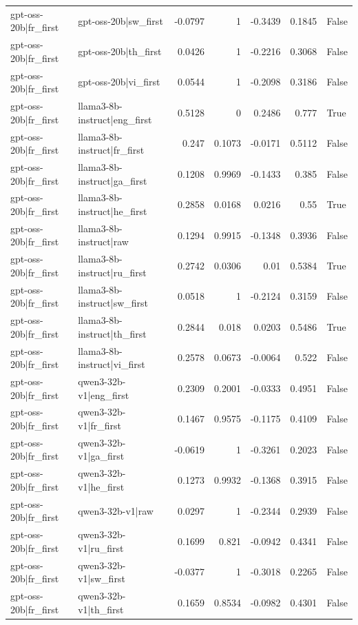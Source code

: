 \begin{table}
\begin{tabular}{l l r r r r l}
gpt-oss-20b|fr_first & gpt-oss-20b|sw_first & -0.0797 & 1 & -0.3439 & 0.1845 & False \\
gpt-oss-20b|fr_first & gpt-oss-20b|th_first & 0.0426 & 1 & -0.2216 & 0.3068 & False \\
gpt-oss-20b|fr_first & gpt-oss-20b|vi_first & 0.0544 & 1 & -0.2098 & 0.3186 & False \\
gpt-oss-20b|fr_first & llama3-8b-instruct|eng_first & 0.5128 & 0 & 0.2486 & 0.777 & True \\
gpt-oss-20b|fr_first & llama3-8b-instruct|fr_first & 0.247 & 0.1073 & -0.0171 & 0.5112 & False \\
gpt-oss-20b|fr_first & llama3-8b-instruct|ga_first & 0.1208 & 0.9969 & -0.1433 & 0.385 & False \\
gpt-oss-20b|fr_first & llama3-8b-instruct|he_first & 0.2858 & 0.0168 & 0.0216 & 0.55 & True \\
gpt-oss-20b|fr_first & llama3-8b-instruct|raw & 0.1294 & 0.9915 & -0.1348 & 0.3936 & False \\
gpt-oss-20b|fr_first & llama3-8b-instruct|ru_first & 0.2742 & 0.0306 & 0.01 & 0.5384 & True \\
gpt-oss-20b|fr_first & llama3-8b-instruct|sw_first & 0.0518 & 1 & -0.2124 & 0.3159 & False \\
gpt-oss-20b|fr_first & llama3-8b-instruct|th_first & 0.2844 & 0.018 & 0.0203 & 0.5486 & True \\
gpt-oss-20b|fr_first & llama3-8b-instruct|vi_first & 0.2578 & 0.0673 & -0.0064 & 0.522 & False \\
gpt-oss-20b|fr_first & qwen3-32b-v1|eng_first & 0.2309 & 0.2001 & -0.0333 & 0.4951 & False \\
gpt-oss-20b|fr_first & qwen3-32b-v1|fr_first & 0.1467 & 0.9575 & -0.1175 & 0.4109 & False \\
gpt-oss-20b|fr_first & qwen3-32b-v1|ga_first & -0.0619 & 1 & -0.3261 & 0.2023 & False \\
gpt-oss-20b|fr_first & qwen3-32b-v1|he_first & 0.1273 & 0.9932 & -0.1368 & 0.3915 & False \\
gpt-oss-20b|fr_first & qwen3-32b-v1|raw & 0.0297 & 1 & -0.2344 & 0.2939 & False \\
gpt-oss-20b|fr_first & qwen3-32b-v1|ru_first & 0.1699 & 0.821 & -0.0942 & 0.4341 & False \\
gpt-oss-20b|fr_first & qwen3-32b-v1|sw_first & -0.0377 & 1 & -0.3018 & 0.2265 & False \\
gpt-oss-20b|fr_first & qwen3-32b-v1|th_first & 0.1659 & 0.8534 & -0.0982 & 0.4301 & False \\

\end{tabular}
\end{table}
